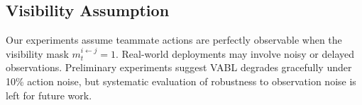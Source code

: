 \documentclass{article}
\theoremstyle{plain}
\theoremstyle{definition}
\theoremstyle{remark}
\begin{document}
\subsection{Visibility Assumption}
\label{app:visibility}

Our experiments assume teammate actions are perfectly observable when the visibility mask $m_t^{i \leftarrow j} = 1$. Real-world deployments may involve noisy or delayed observations. Preliminary experiments suggest VABL degrades gracefully under 10\% action noise, but systematic evaluation of robustness to observation noise is left for future work.
\end{document}
